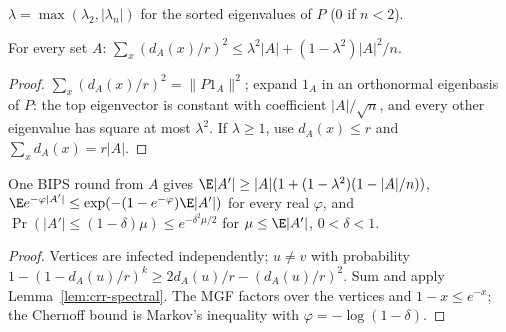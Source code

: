 \begin{definition}\label{def:lambda}
\leanok
$\lambda=\max(\lambda_2,|\lambda_n|)$ for the sorted eigenvalues of $P$ ($0$ if $n<2$).
\end{definition}

\begin{lemma}\label{lem:crr-spectral}
\leanok{}
For every set $A$: $\sum_x (d_A(x)/r)^2\le\lambda^2|A|+(1-\lambda^2)|A|^2/n$.
\end{lemma}
\begin{proof}\leanok
$\sum_x(d_A(x)/r)^2=\|P1_A\|^2$; expand $1_A$ in an orthonormal eigenbasis of $P$: the top
eigenvector is constant with coefficient $|A|/\sqrt n$, and every other eigenvalue has square
at most $\lambda^2$. If $\lambda\ge1$, use $d_A(x)\le r$ and $\sum_x d_A(x)=r|A|$.
\end{proof}

\begin{lemma}\label{lem:crr-growth}
\leanok{}
One BIPS round from $A$ gives $\E|A'|\ge|A|(1+(1-\lambda^2)(1-|A|/n))$,
$\E e^{-\varphi|A'|}\le\exp(-(1-e^{-\varphi})\E|A'|)$ for every real $\varphi$, and
$\Pr(|A'|\le(1-\delta)\mu)\le e^{-\delta^2\mu/2}$ for $\mu\le\E|A'|$, $0<\delta<1$.
\end{lemma}
\begin{proof}\leanok
Vertices are infected independently; $u\ne v$ with probability $1-(1-d_A(u)/r)^k\ge
2d_A(u)/r-(d_A(u)/r)^2$. Sum and apply Lemma~\ref{lem:crr-spectral}. The MGF factors over the
vertices and $1-x\le e^{-x}$; the Chernoff bound is Markov's inequality with
$\varphi=-\log(1-\delta)$.
\end{proof}

